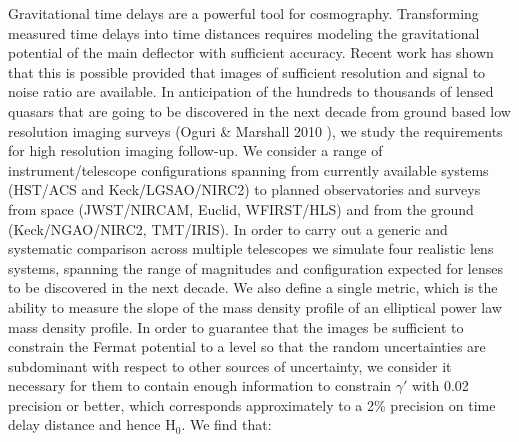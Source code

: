 \documentclass[a4paper,11pt]{article}
\begin{document}
Gravitational time delays are a powerful tool for
cosmography. Transforming measured time delays into time distances
requires modeling the gravitational potential of the main deflector
with sufficient accuracy. Recent work has shown that this is possible
provided that images of sufficient resolution and signal to noise
ratio are available. In anticipation of the hundreds to thousands of
lensed quasars that are going to be discovered in the next decade from
ground based low resolution imaging surveys (Oguri \& Marshall 2010
\cite{2010MNRAS.405.2579O}), we study the requirements for high
resolution imaging follow-up. We consider a range of
instrument/telescope configurations spanning from currently available
systems (HST/ACS and Keck/LGSAO/NIRC2) to planned observatories and
surveys from space (JWST/NIRCAM, Euclid, WFIRST/HLS) and from the
ground (Keck/NGAO/NIRC2, TMT/IRIS). In order to carry out a generic
and systematic comparison across multiple telescopes we simulate four
realistic lens systems, spanning the range of magnitudes and
configuration expected for lenses to be discovered in the next
decade. We also define a single metric, which is the ability to
measure the slope of the mass density profile of an elliptical power
law mass density profile. In order to guarantee that the images be
sufficient to constrain the Fermat potential to a level so that the
random uncertainties are subdominant with respect to other sources of
uncertainty, we consider it necessary for them to contain enough
information to constrain $\gamma'$ with 0.02 precision or better,
which corresponds approximately to a 2\% precision on time delay
distance and hence H$_0$. We find that:
\end{document}

